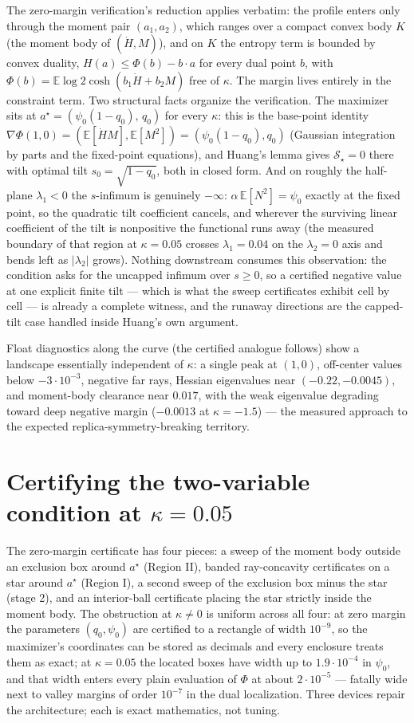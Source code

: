 \documentclass[11pt]{article}
\theoremstyle{remark}
\newcommand{\E}{\mathbb{E}}
\newcommand{\sS}{\mathcal{S}}
\begin{document}
The zero-margin verification's reduction applies verbatim: the
profile enters only through the moment pair $(a_1,a_2)$, which ranges
over a compact convex body $K$ (the moment body of $(\dot H,M)$), and
on $K$ the entropy term is bounded by convex duality,
$H(a)\le\Phi(b)-b\cdot a$ for every dual point $b$, with
$\Phi(b)=\E\log2\cosh(b_1\dot H+b_2M)$ free of $\kappa$.  The margin
lives entirely in the constraint term.  Two structural facts organize
the verification.  The maximizer sits at
$a^\star=(\psi_0(1-q_0),\,q_0)$ for every $\kappa$: this is the
base-point identity $\nabla\Phi(1,0)=(\E[\dot H M],\E[M^2])
=(\psi_0(1-q_0),q_0)$ (Gaussian integration by parts and the
fixed-point equations), and Huang's lemma gives
$\sS_\star=0$ there with optimal tilt $s_0=\sqrt{1-q_0}$, both in
closed form.  And on roughly the half-plane $\lambda_1<0$ the
$s$-infimum is genuinely $-\infty$: $\alpha\,\E[N^2]=\psi_0$ exactly
at the fixed point, so the quadratic tilt coefficient cancels, and
wherever the surviving linear coefficient of the tilt is nonpositive
the functional runs away (the measured boundary of that region at
$\kappa=0.05$ crosses $\lambda_1=0.04$ on the $\lambda_2=0$ axis and
bends left as $|\lambda_2|$ grows).  Nothing downstream consumes
this observation: the condition asks for the uncapped infimum over
$s\ge0$, so a certified negative value at one explicit finite tilt
--- which is what the sweep certificates exhibit cell by cell --- is
already a complete witness, and the runaway directions are the
capped-tilt case handled inside Huang's own argument.

Float diagnostics along the curve (the certified analogue follows)
show a landscape essentially independent of $\kappa$: a single peak
at $(1,0)$, off-center values below $-3\cdot10^{-3}$, negative far
rays, Hessian eigenvalues near $(-0.22,-0.0045)$, and moment-body
clearance near $0.017$, with the weak eigenvalue degrading toward
deep negative margin ($-0.0013$ at $\kappa=-1.5$) --- the measured
approach to the expected replica-symmetry-breaking territory.

\section{Certifying the two-variable condition at
$\kappa=0.05$}\label{sec:regionI}

The zero-margin certificate has four pieces: a sweep of the moment
body outside an exclusion box around $a^\star$ (Region II), banded
ray-concavity certificates on a star around $a^\star$ (Region I), a
second sweep of the exclusion box minus the star (stage 2), and an
interior-ball certificate placing the star strictly inside the
moment body.  The obstruction at $\kappa\ne0$ is uniform across all
four: at zero margin the parameters $(q_0,\psi_0)$ are certified to a
rectangle of width $10^{-9}$, so the maximizer's coordinates can be
stored as decimals and every enclosure treats them as exact; at
$\kappa=0.05$ the located boxes have width up to $1.9\cdot10^{-4}$ in
$\psi_0$, and that width enters every plain evaluation of $\Phi$ at
about $2\cdot10^{-5}$ --- fatally wide next to valley margins of
order $10^{-7}$ in the dual localization.  Three devices repair the
architecture; each is exact mathematics, not tuning.
\end{document}
